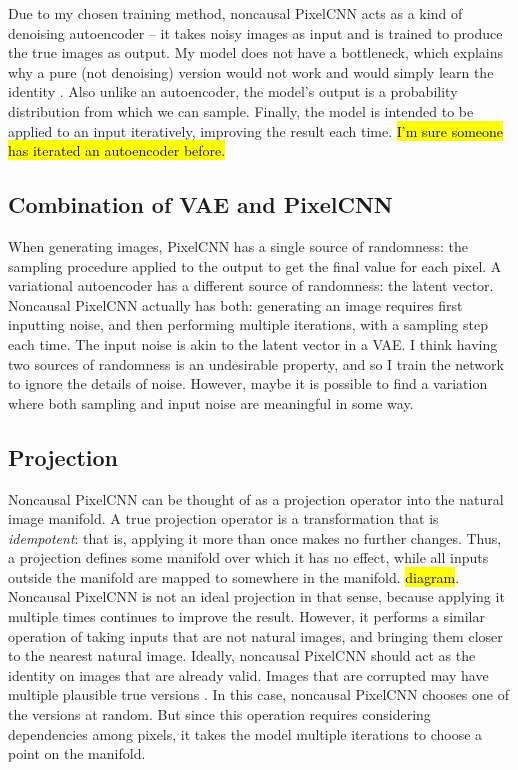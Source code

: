 \documentclass[10pt,a4paper]{article}
\begin{document}
Due to my chosen training method, noncausal PixelCNN acts as a kind of denoising autoencoder \cite{denoisingautoencoder} -- it takes noisy images as input and is trained to produce the true images as output. My model does not have a bottleneck, which explains why a pure (not denoising) version would not work and would simply learn the identity \cite{??}. Also unlike an autoencoder, the model's output is a probability distribution from which we can sample. Finally, the model is intended to be applied to an input iteratively, improving the result each time. \hl{I'm sure someone has iterated an autoencoder before.}

\subsection{Combination of VAE and PixelCNN}

When generating images, PixelCNN has a single source of randomness: the sampling procedure applied to the output to get the final value for each pixel. A variational autoencoder \cite{vae} has a different source of randomness: the latent vector. Noncausal PixelCNN actually has both: generating an image requires first inputting noise, and then performing multiple iterations, with a sampling step each time. The input noise is akin to the latent vector in a VAE. I think having two sources of randomness is an undesirable property, and so I train the network to ignore the details of noise. However, maybe it is possible to find a variation where both sampling and input noise are meaningful in some way.

\subsection{Projection}

Noncausal PixelCNN can be thought of as a projection operator into the natural image manifold. A true projection operator \cite{??} is a transformation that is \emph{idempotent}: that is, applying it more than once makes no further changes. Thus, a projection defines some manifold over which it has no effect, while all inputs outside the manifold are mapped to somewhere in the manifold. \hl{diagram}. Noncausal PixelCNN is not an ideal projection in that sense, because applying it multiple times continues to improve the result. However, it performs a similar operation of taking inputs that are not natural images, and bringing them closer to the nearest natural image. Ideally, noncausal PixelCNN should act as the identity on images that are already valid. Images that are corrupted may have multiple plausible true versions \cite{??}. In this case, noncausal PixelCNN chooses one of the versions at random. But since this operation requires considering dependencies among pixels, it takes the model multiple iterations to choose a point on the manifold.
\end{document}
